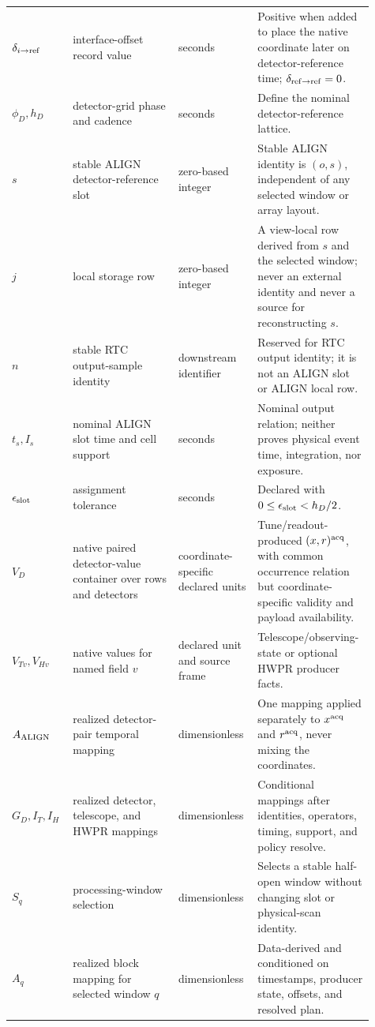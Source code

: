 \begin{longtable}{L{0.16\linewidth}L{0.28\linewidth}L{0.20\linewidth}L{0.27\linewidth}}
\(\delta_{i\rightarrow\rm ref}\) & interface-offset record value & seconds & Positive when added to place the native coordinate later on detector-reference time; \(\delta_{{\rm ref}\rightarrow{\rm ref}}=0\).\\
\(\phi_D,h_D\) & detector-grid phase and cadence & seconds & Define the nominal detector-reference lattice.\\
\(s\) & stable ALIGN detector-reference slot & zero-based integer & Stable ALIGN identity is \((o,s)\), independent of any selected window or array layout.\\
\(j\) & local storage row & zero-based integer & A view-local row derived from \(s\) and the selected window; never an external identity and never a source for reconstructing \(s\).\\
\(n\) & stable RTC output-sample identity & downstream identifier & Reserved for RTC output identity; it is not an ALIGN slot or ALIGN local row.\\
\(t_s,I_s\) & nominal ALIGN slot time and cell support & seconds & Nominal output relation; neither proves physical event time, integration, nor exposure.\\
\(\epsilon_{\rm slot}\) & assignment tolerance & seconds & Declared with \(0\leq\epsilon_{\rm slot}<h_D/2\).\\
\(V_D\) & native paired detector-value container over rows and detectors & coordinate-specific declared units & Tune/readout-produced \((x,r)^{\rm acq}\), with common occurrence relation but coordinate-specific validity and payload availability.\\
\(V_{Tv},V_{Hv}\) & native values for named field \(v\) & declared unit and source frame & Telescope/observing-state or optional HWPR producer facts.\\
\(A_{\rm ALIGN}\) & realized detector-pair temporal mapping & dimensionless & One mapping applied separately to \(x^{\rm acq}\) and \(r^{\rm acq}\), never mixing the coordinates.\\
\(G_D,I_T,I_H\) & realized detector, telescope, and HWPR mappings & dimensionless & Conditional mappings after identities, operators, timing, support, and policy resolve.\\
\(S_q\) & processing-window selection & dimensionless & Selects a stable half-open window without changing slot or physical-scan identity.\\
\(A_q\) & realized block mapping for selected window \(q\) & dimensionless & Data-derived and conditioned on timestamps, producer state, offsets, and resolved plan.\\

\end{longtable}
